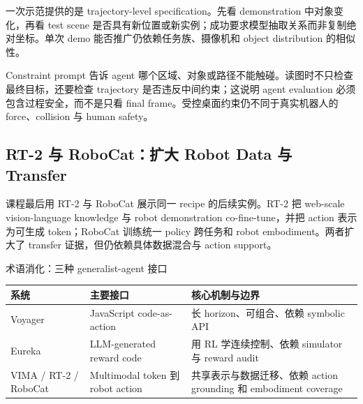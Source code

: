 一次示范提供的是 trajectory-level specification。先看 demonstration 中对象变化，再看 test scene 是否具有新位置或新实例；成功要求模型抽取关系而非复制绝对坐标。单次 demo 能否推广仍依赖任务族、摄像机和 object distribution 的相似性。


Constraint prompt 告诉 agent 哪个区域、对象或路径不能触碰。读图时不只检查最终目标，还要检查 trajectory 是否违反中间约束；这说明 agent evaluation 必须包含过程安全，而不是只看 final frame。受控桌面约束仍不同于真实机器人的 force、collision 与 human safety。


\subsection{RT-2 与 RoboCat：扩大 Robot Data 与 Transfer}

课程最后用 RT-2 与 RoboCat 展示同一 recipe 的后续实例。RT-2 把 web-scale vision-language knowledge 与 robot demonstration co-fine-tune，并把 action 表示为可生成 token；RoboCat 训练统一 policy 跨任务和 robot embodiment。两者扩大了 transfer 证据，但仍依赖具体数据混合与 action support。


\begin{knowledgebox}{术语消化：三种 generalist-agent 接口}
\begin{tabularx}{\textwidth}{@{}L{0.17\textwidth}L{0.25\textwidth}X@{}}
\toprule
系统 & 主要接口 & 核心机制与边界 \\
\midrule
Voyager & JavaScript code-as-action & 长 horizon、可组合、依赖 symbolic API \\
Eureka & LLM-generated reward code & 用 RL 学连续控制、依赖 simulator 与 reward audit \\
VIMA / RT-2 / RoboCat & Multimodal token 到 robot action & 共享表示与数据迁移、依赖 action grounding 和 embodiment coverage \\
\bottomrule
\end{tabularx}
\end{knowledgebox}

